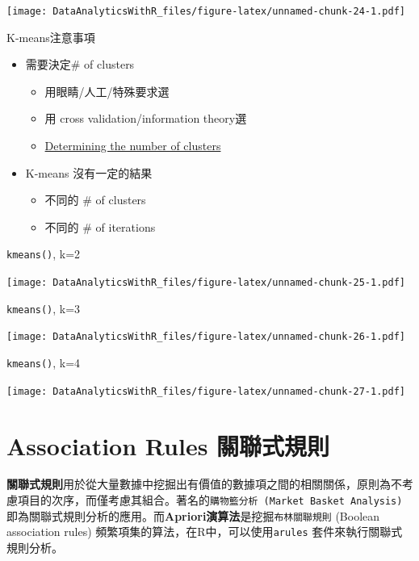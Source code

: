 \documentclass[]{book}
\providecommand{\tightlist}{%
  \setlength{\itemsep}{0pt}\setlength{\parskip}{0pt}}
\begin{document}
\texttt{[image: DataAnalyticsWithR\_files/figure-latex/unnamed-chunk-24-1.pdf]}

K-means注意事項

\begin{itemize}
\tightlist
\item
  需要決定\# of clusters

  \begin{itemize}
  \tightlist
  \item
    用眼睛/人工/特殊要求選
  \item
    用 cross validation/information theory選
  \item
    \href{http://en.wikipedia.org/wiki/Determining_the_number_of_clusters_in_a_data_set}{Determining the number of clusters}
  \end{itemize}
\item
  K-means 沒有一定的結果

  \begin{itemize}
  \tightlist
  \item
    不同的 \# of clusters
  \item
    不同的 \# of iterations
  \end{itemize}
\end{itemize}

\texttt{kmeans()}, k=2

\texttt{[image: DataAnalyticsWithR\_files/figure-latex/unnamed-chunk-25-1.pdf]}

\texttt{kmeans()}, k=3

\texttt{[image: DataAnalyticsWithR\_files/figure-latex/unnamed-chunk-26-1.pdf]}

\texttt{kmeans()}, k=4

\texttt{[image: DataAnalyticsWithR\_files/figure-latex/unnamed-chunk-27-1.pdf]}

\hypertarget{association-rules-ux95dcux806fux5f0fux898fux5247}{%
\section{Association Rules 關聯式規則}\label{association-rules-ux95dcux806fux5f0fux898fux5247}}

\textbf{關聯式規則}用於從大量數據中挖掘出有價值的數據項之間的相關關係，原則為不考慮項目的次序，而僅考慮其組合。著名的\texttt{購物籃分析\ (Market\ Basket\ Analysis)}即為關聯式規則分析的應用。而\textbf{Apriori演算法}是挖掘\texttt{布林關聯規則} (Boolean association rules) 頻繁項集的算法，在R中，可以使用\texttt{arules}\citep{R-arules} 套件來執行關聯式規則分析。
\end{document}
